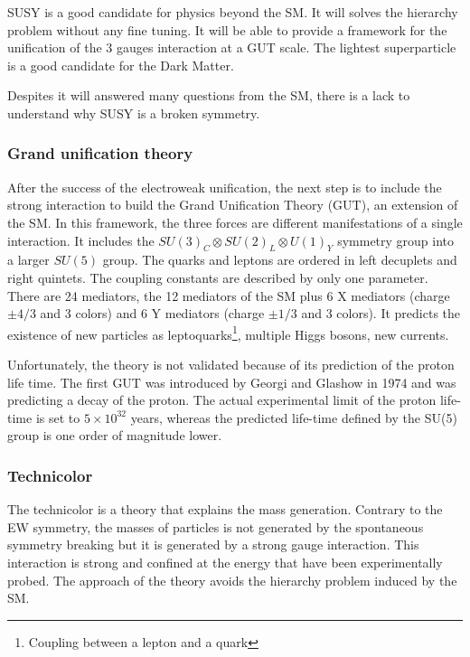       SUSY is a good candidate for physics beyond the SM. 
      It will solves the hierarchy problem without any fine tuning.
      It will be able to provide a framework for the unification of the 3 gauges interaction at a GUT scale.
      The lightest superparticle is a good candidate for the Dark Matter.

      Despites it will answered many questions from the SM, there is a lack to understand why SUSY is a broken symmetry.
      
      \subsubsection{Grand unification theory}
      
      After the success of the electroweak unification, the next step is to include the strong interaction to build the Grand Unification Theory (GUT), an extension of the SM.
      In this framework, the three forces are different manifestations of a single interaction. 
      It includes the $SU(3)_C \otimes SU(2)_L \otimes U(1)_Y$ symmetry group into a larger $SU(5)$ group. 
      The quarks and leptons are ordered in left decuplets and right quintets.
      The coupling constants are described by only one parameter.  
      There are 24 mediators, the 12 mediators of the SM plus 6 X mediators (charge $\pm4/3$ and 3 colors) and 6 Y mediators (charge $\pm1/3$ and 3 colors).
      It predicts the existence of new particles as leptoquarks\footnote{Coupling between a lepton and a quark}, multiple Higgs bosons, new currents.

      Unfortunately, the theory is not validated because of its prediction of the proton life time. 
      The first GUT was introduced by Georgi and Glashow in 1974 and was predicting a decay of the proton. 
      The actual experimental limit of the proton life-time is set to $5 \times 10^{32}$ years, whereas the predicted life-time defined by the SU(5) group is one order of magnitude lower.

      \subsubsection{Technicolor}

      The technicolor is a theory that explains the mass generation.
      Contrary to the EW symmetry, the masses of particles is not generated by the spontaneous symmetry breaking but it is generated by a strong gauge interaction.
      This interaction is strong and confined at the energy that have been experimentally probed.
      The approach of the theory avoids the hierarchy problem induced by the SM.
      
